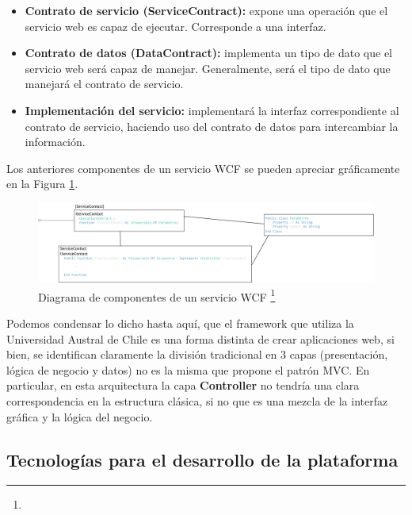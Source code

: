 \begin{itemize}
	
	\item \textbf{Contrato de servicio (ServiceContract):} expone una operación que el servicio web es capaz de ejecutar. Corresponde a una interfaz.
	
	\item \textbf{ Contrato de datos (DataContract):} implementa un tipo de dato que el servicio web será capaz de manejar. Generalmente, será el tipo de dato que manejará el contrato de servicio.
	
	\item \textbf{Implementación del servicio:} implementará la interfaz correspondiente al contrato de servicio, haciendo uso del contrato de datos para intercambiar la información.
	
\end{itemize}
 
 Los anteriores componentes de un servicio WCF se pueden apreciar gráficamente en la Figura \ref{FiguraWCF}.
 
 	\begin{figure}[H]
 		\centering
 		\includegraphics[width=1\textwidth]{images/Capitulo_2/WFC.png}
 		\caption[Diagrama de componentes de un servicio WCF]{Diagrama de componentes de un servicio WCF \footnote{}}
 		\label{FiguraWCF}
 	\end{figure}

Podemos condensar lo dicho hasta aquí, que el framework que utiliza la Universidad Austral de Chile es una forma distinta de crear aplicaciones web, si bien, se identifican claramente  la división tradicional en 3 capas (presentación, lógica de negocio y datos) no es la misma que propone el patrón MVC. En particular, en esta arquitectura  la capa \textbf{Controller} no tendría una clara correspondencia en la estructura clásica, si no que es  una mezcla de la interfaz gráfica y la lógica del negocio.

\subsection{Tecnologías para el desarrollo de la plataforma}

